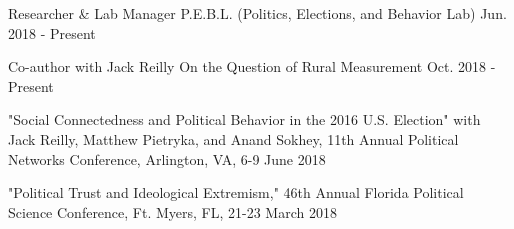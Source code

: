 

\begin{cventries}

    \cventry
      {Researcher \& Lab Manager} %
      {P.E.B.L. (Politics, Elections, and Behavior Lab)} %
      {Jun. 2018 - Present} %
      {} %
      {}


    \cventry
      {Co-author with Jack Reilly} %
      {On the Question of Rural Measurement} %
      {Oct. 2018 - Present} %
      {} %
      {}


\cventry
  {} %
  {"Social Connectedness and Political Behavior in the 2016 U.S. Election" with Jack Reilly, Matthew Pietryka, and Anand Sokhey, 11th Annual Political Networks Conference, Arlington, VA, 6-9 June 2018} %
  {} %
  {} %
  {}


  \cventry
    {} %
    {"Political Trust and Ideological Extremism," 46th Annual Florida Political Science Conference, Ft. Myers, FL, 21-23 March 2018} %
    {} %
    {} %
    {}


\end{cventries}
